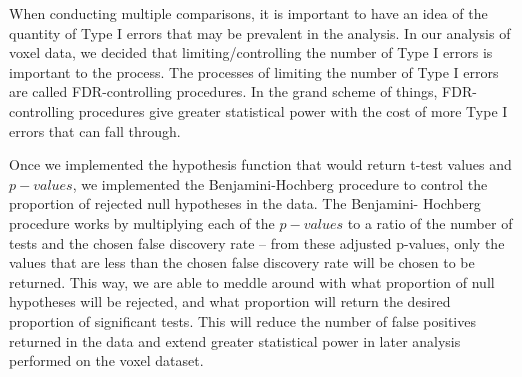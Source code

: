 \par \indent When conducting multiple comparisons, it is important to have an 
idea of the quantity of Type I errors that may be prevalent in the analysis. 
In our analysis of voxel data, we decided that limiting/controlling the number 
of Type I errors is important to the process. The processes of limiting the 
number of Type I errors are called FDR-controlling procedures. In the grand 
scheme of things, FDR-controlling procedures give greater statistical power 
with the cost of more Type I errors that can fall through. 
\par Once we implemented the hypothesis function that would return t-test 
values and $p-values$, we implemented the Benjamini-Hochberg procedure to 
control the proportion of rejected null hypotheses in the data. The Benjamini-
Hochberg procedure works by multiplying each of the $p-values$ to a ratio of the 
number of tests and the chosen false discovery rate -- from these adjusted 
p-values, only the values that are less than the chosen false discovery rate 
will be chosen to be returned. This way, we are able to meddle around with 
what proportion of null hypotheses will be rejected, and what proportion will 
return the desired proportion of significant tests. This will reduce the number
of false positives returned in the data and extend greater statistical power 
in later analysis performed on the voxel dataset.
